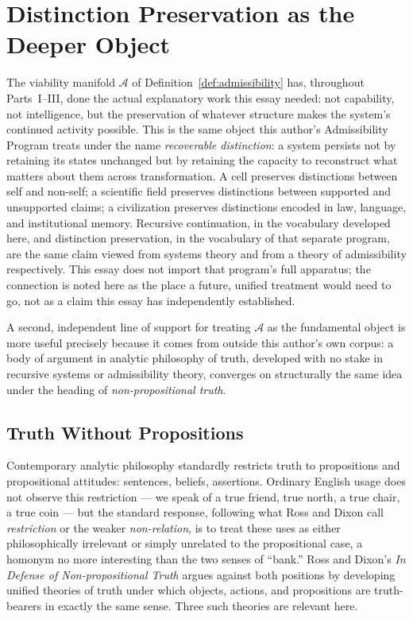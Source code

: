 \documentclass[12pt,a4paper]{article}
\theoremstyle{plain}
\theoremstyle{definition}
\theoremstyle{remark}
\newcommand{\Adm}{\mathcal{A}}
\begin{document}
\section{Distinction Preservation as the Deeper Object}
\label{sec:distinction-preservation}

The viability manifold $\Adm$ of Definition~\ref{def:admissibility} has, throughout Parts~I--III, done the actual explanatory work this essay needed: not capability, not intelligence, but the preservation of whatever structure makes the system's continued activity possible. This is the same object this author's Admissibility Program treats under the name \emph{recoverable distinction}: a system persists not by retaining its states unchanged but by retaining the capacity to reconstruct what matters about them across transformation. A cell preserves distinctions between self and non-self; a scientific field preserves distinctions between supported and unsupported claims; a civilization preserves distinctions encoded in law, language, and institutional memory. Recursive continuation, in the vocabulary developed here, and distinction preservation, in the vocabulary of that separate program, are the same claim viewed from systems theory and from a theory of admissibility respectively. This essay does not import that program's full apparatus; the connection is noted here as the place a future, unified treatment would need to go, not as a claim this essay has independently established.

A second, independent line of support for treating $\Adm$ as the fundamental object is more useful precisely because it comes from outside this author's own corpus: a body of argument in analytic philosophy of truth, developed with no stake in recursive systems or admissibility theory, converges on structurally the same idea under the heading of \emph{non-propositional truth}.

\subsection{Truth Without Propositions}
\label{subsec:truth-without-propositions}

Contemporary analytic philosophy standardly restricts truth to propositions and propositional attitudes: sentences, beliefs, assertions. Ordinary English usage does not observe this restriction — we speak of a true friend, true north, a true chair, a true coin — but the standard response, following what Ross and Dixon call \emph{restriction} or the weaker \emph{non-relation}, is to treat these uses as either philosophically irrelevant or simply unrelated to the propositional case, a homonym no more interesting than the two senses of ``bank.'' Ross and Dixon's \emph{In Defense of Non-propositional Truth} argues against both positions by developing unified theories of truth under which objects, actions, and propositions are truth-bearers in exactly the same sense. Three such theories are relevant here.
\end{document}
